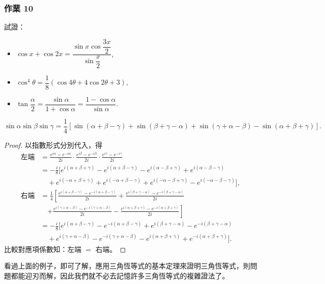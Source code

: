 \subsubsection*{作業 10}
試證：
\begin{itemize}
  \item[(i)] $\cos x+\cos 2x = \dfrac{\sin x\cos\dfrac{3x}{2}}{\sin\dfrac{x}{2}}$,
  \item[(ii)] $\cos^4\theta = \dfrac{1}{8}(\cos 4\theta+4\cos 2\theta+3)$,
  \item[(iii)] $\tan\dfrac{\alpha}{2} = \dfrac{\sin\alpha}{1+\cos\alpha} = \dfrac{1-\cos\alpha}{\sin\alpha}$.
\end{itemize}


\begin{example}
\[
\sin\alpha\sin\beta\sin\gamma = \frac{1}{4}[\sin(\alpha+\beta-\gamma)+\sin(\beta+\gamma-\alpha)+\sin(\gamma+\alpha-\beta)-\sin(\alpha+\beta+\gamma)].
\]
\end{example}

\begin{proof}
以指數形式分別代入，得
\begin{align*}
\text{左端} &= \frac{e^{i\alpha}-e^{-i\alpha}}{2i}\cdot\frac{e^{i\beta}-e^{-i\beta}}{2i}\cdot\frac{e^{i\gamma}-e^{-i\gamma}}{2i} \\
&= -\frac{i}{8}[e^{i(\alpha+\beta+\gamma)}-e^{i(\alpha+\beta-\gamma)}-e^{i(\alpha-\beta+\gamma)}+e^{i(\alpha-\beta-\gamma)} \\
&\quad +e^{i(-\alpha+\beta+\gamma)}+e^{i(-\alpha+\beta-\gamma)}+e^{i(-\alpha-\beta+\gamma)}-e^{i(-\alpha-\beta-\gamma)}], \\
\text{右端} &= \frac{1}{4}\left[\frac{e^{i(\alpha+\beta-\gamma)}-e^{-i(\alpha+\beta-\gamma)}}{2i} + \frac{e^{i(\beta+\gamma-\alpha)}-e^{-i(\beta+\gamma-\alpha)}}{2i}\right. \\
&\quad \left.+ \frac{e^{i(\gamma+\alpha-\beta)}-e^{-i(\gamma+\alpha-\beta)}}{2i} - \frac{e^{i(\alpha+\beta+\gamma)}-e^{-i(\alpha+\beta+\gamma)}}{2i}\right] \\
&= -\frac{i}{8}[e^{i(\alpha+\beta-\gamma)}-e^{-i(\alpha+\beta-\gamma)}+e^{i(\beta+\gamma-\alpha)}-e^{-i(\beta+\gamma-\alpha)} \\
&\quad +e^{i(\gamma+\alpha-\beta)}-e^{-i(\gamma+\alpha-\beta)}-e^{i(\alpha+\beta+\gamma)}+e^{-i(\alpha+\beta+\gamma)}].
\end{align*}
比較對應項係數知：左端 $=$ 右端。 \qedhere
\end{proof}

看過上面的例子，即可了解，應用三角恆等式的基本定理來證明三角恆等式，則問題都能迎刃而解，因此我們就不必去記憶許多三角恆等式的複雜證法了。

